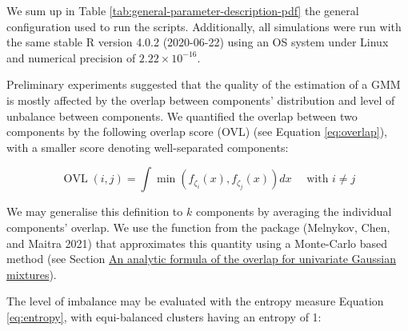 We sum up in Table \ref{tab:general-parameter-description-pdf} the general configuration used to run the scripts. Additionally, all simulations were run with the same stable R version 4.0.2 (2020-06-22) using an OS system under Linux and numerical precision of \(2.22 \times 10^{-16}\).

\begin{table}[!h]

\caption{\label{tab:general-parameter-description-pdf}Global options shared by all the benchmarked packages.}
\centering
{}
\end{table}

Preliminary experiments suggested that the quality of the estimation of a
GMM is mostly affected by the overlap between components' distribution
and level of unbalance between components. We quantified the overlap between two components by the following overlap score (OVL) (see Equation
\eqref{eq:overlap}), with a smaller score denoting well-separated
components:

\begin{equation}
       \operatorname{OVL}(i, j) = \int \min (f_{\zeta_i} (x), f_{\zeta_j} (x)) dx \quad \text{ with } i \neq j
  \label{eq:overlap}
\end{equation}

We may generalise this definition to \(k\) components by averaging the
individual components' overlap. We use the function
 from the  package (Melnykov, Chen, and Maitra 2021) that approximates this quantity using a Monte-Carlo based method (see Section \protect\hyperlink{an-analytic-formula-of-the-overlap-for-univariate-gaussian-mixtures}{An analytic formula of the overlap for univariate Gaussian mixtures}).

The level of imbalance may be evaluated with the entropy measure Equation \eqref{eq:entropy}, with equi-balanced clusters having an entropy of 1:

